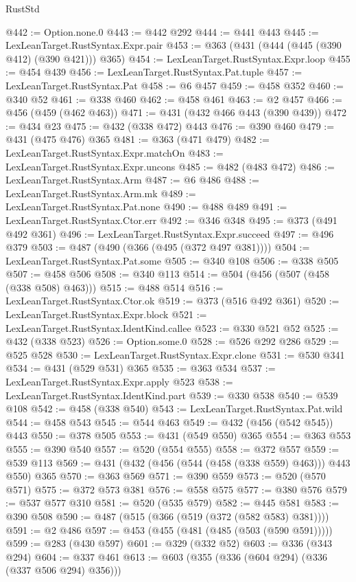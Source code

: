 \begin{lexlean}{RustStd}
\begin{coremodule}
{\begin{coremodule}
{{{{{{{{{{@442 := Option.none.{0}
@443 := @442 @292
@444 := @441 @443
@445 := LexLeanTarget.RustSyntax.Expr.pair
@453 := @363 (@431 (@444 (@445 (@390 @412) (@390 @421))) @365)
@454 := LexLeanTarget.RustSyntax.Expr.loop
@455 := @454 @439
@456 := LexLeanTarget.RustSyntax.Pat.tuple
@457 := LexLeanTarget.RustSyntax.Pat
@458 := @6 @457
@459 := @458 @352
@460 := @340 @52
@461 := @338 @460
@462 := @458 @461
@463 := @2 @457
@466 := @456 (@459 (@462 @463))
@471 := @431 (@432 @466 @443 (@390 @439))
@472 := @434 @23
@475 := @432 (@338 @472) @443
@476 := @390 @460
@479 := @431 (@475 @476) @365
@481 := @363 (@471 @479)
@482 := LexLeanTarget.RustSyntax.Expr.matchOn
@483 := LexLeanTarget.RustSyntax.Expr.uncons
@485 := @482 (@483 @472)
@486 := LexLeanTarget.RustSyntax.Arm
@487 := @6 @486
@488 := LexLeanTarget.RustSyntax.Arm.mk
@489 := LexLeanTarget.RustSyntax.Pat.none
@490 := @488 @489
@491 := LexLeanTarget.RustSyntax.Ctor.err
@492 := @346 @348
@495 := @373 (@491 @492 @361)
@496 := LexLeanTarget.RustSyntax.Expr.succeed
@497 := @496 @379
@503 := @487 (@490 (@366 (@495 (@372 @497 @381))))
@504 := LexLeanTarget.RustSyntax.Pat.some
@505 := @340 @108
@506 := @338 @505
@507 := @458 @506
@508 := @340 @113
@514 := @504 (@456 (@507 (@458 (@338 @508) @463)))
@515 := @488 @514
@516 := LexLeanTarget.RustSyntax.Ctor.ok
@519 := @373 (@516 @492 @361)
@520 := LexLeanTarget.RustSyntax.Expr.block
@521 := LexLeanTarget.RustSyntax.IdentKind.callee
@523 := @330 @521 @52
@525 := @432 (@338 @523)
@526 := Option.some.{0}
@528 := @526 @292 @286
@529 := @525 @528
@530 := LexLeanTarget.RustSyntax.Expr.clone
@531 := @530 @341
@534 := @431 (@529 @531) @365
@535 := @363 @534
@537 := LexLeanTarget.RustSyntax.Expr.apply @523
@538 := LexLeanTarget.RustSyntax.IdentKind.part
@539 := @330 @538
@540 := @539 @108
@542 := @458 (@338 @540)
@543 := LexLeanTarget.RustSyntax.Pat.wild
@544 := @458 @543
@545 := @544 @463
@549 := @432 (@456 (@542 @545)) @443
@550 := @378 @505
@553 := @431 (@549 @550) @365
@554 := @363 @553
@555 := @390 @540
@557 := @520 (@554 @555)
@558 := @372 @557
@559 := @539 @113
@569 := @431 (@432 (@456 (@544 (@458 (@338 @559) @463))) @443 @550) @365
@570 := @363 @569
@571 := @390 @559
@573 := @520 (@570 @571)
@575 := @372 @573 @381
@576 := @558 @575
@577 := @380 @576
@579 := @537 @577 @310
@581 := @520 (@535 @579)
@582 := @445 @581
@583 := @390 @508
@590 := @487 (@515 (@366 (@519 (@372 (@582 @583) @381))))
@591 := @2 @486
@597 := @453 (@455 (@481 (@485 (@503 (@590 @591)))))
@599 := @283 (@430 @597)
@601 := @329 (@332 @52)
@603 := @336 (@343 @294)
@604 := @337 @461
@613 := @603 (@355 (@336 (@604 @294) (@336 (@337 @506 @294) @356)))
}}}}}}}}}}
\end{coremodule}}
\end{coremodule}
\end{lexlean}

